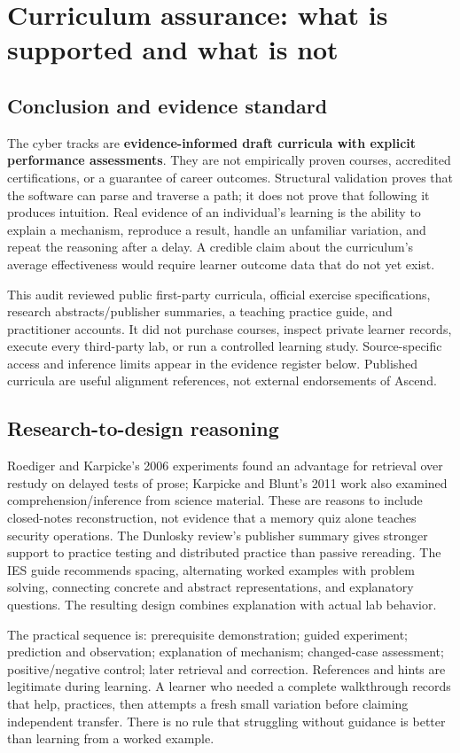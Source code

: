 \section{Curriculum assurance: what is supported and what is not}
\label{curriculum-assurance}
\subsection{Conclusion and evidence standard}
The cyber tracks are \textbf{evidence-informed draft curricula with explicit
performance assessments}. They are not empirically proven courses, accredited
certifications, or a guarantee of career outcomes. Structural validation proves
that the software can parse and traverse a path; it does not prove that following
it produces intuition. Real evidence of an individual's learning is the ability
to explain a mechanism, reproduce a result, handle an unfamiliar variation, and
repeat the reasoning after a delay. A credible claim about the curriculum's
average effectiveness would require learner outcome data that do not yet exist.

This audit reviewed public first-party curricula, official exercise specifications,
research abstracts/publisher summaries, a teaching practice guide, and practitioner
accounts. It did not purchase courses, inspect private learner records, execute
every third-party lab, or run a controlled learning study. Source-specific access
and inference limits appear in the evidence register below. Published curricula
are useful alignment references, not external endorsements of Ascend.

\subsection{Research-to-design reasoning}
Roediger and Karpicke's 2006 experiments found an advantage for retrieval over
restudy on delayed tests of prose; Karpicke and Blunt's 2011 work also examined
comprehension/inference from science material. These are reasons to include
closed-notes reconstruction, not evidence that a memory quiz alone teaches
security operations. The Dunlosky review's publisher summary gives stronger
support to practice testing and distributed practice than passive rereading.
The IES guide recommends spacing, alternating worked examples with problem
solving, connecting concrete and abstract representations, and explanatory
questions. The resulting design combines explanation with actual lab behavior.

The practical sequence is: prerequisite demonstration; guided experiment;
prediction and observation; explanation of mechanism; changed-case assessment;
positive/negative control; later retrieval and correction. References and hints
are legitimate during learning. A learner who needed a complete walkthrough
records that help, practices, then attempts a fresh small variation before claiming
independent transfer. There is no rule that struggling without guidance is better
than learning from a worked example.


